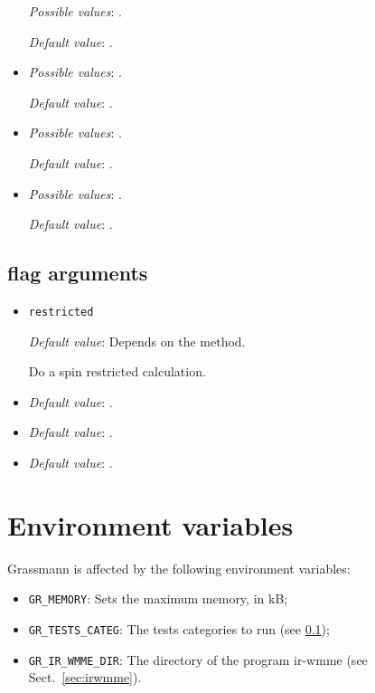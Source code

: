\begin{itemize}
  \emph{Possible values}: .

  \emph{Default value}: .

\item \verb++

  \emph{Possible values}: .

  \emph{Default value}: .

\item \verb++

  \emph{Possible values}: .

  \emph{Default value}: .

\item \verb++

  \emph{Possible values}: .

  \emph{Default value}: .



  
\end{itemize}

\subsection{flag arguments}

\begin{itemize}
\item \verb+restricted+

  \emph{Default value}: Depends on the method.

  Do a spin restricted calculation.

\item \verb++

  \emph{Default value}: .

\item \verb++

  \emph{Default value}: .

\item \verb++

  \emph{Default value}: .


\end{itemize}


\section{Environment variables}
\label{sec:envvar}

Grassmann is affected by the following environment variables:
\begin{itemize}
\item \verb+GR_MEMORY+: Sets the maximum memory, in kB;
\item \verb+GR_TESTS_CATEG+: The tests categories to run (see \ref{});
\item \verb+GR_IR_WMME_DIR+: The directory of the program ir-wmme (see Sect.~\ref{sec:irwmme}).
\end{itemize}





